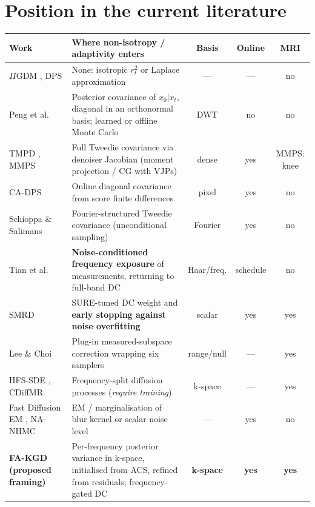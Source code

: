 \documentclass[10pt,a4paper]{article}
\newcommand{\fakgd}{FA-KGD}
\newcommand{\pigdm}{$\Pi$GDM}
\begin{document}
\section{Position in the current literature}
\label{sec:lit}
\begin{center}
\small
\begin{tabularx}{\linewidth}{@{}l L c c c@{}}
\toprule
Work & Where non-isotropy / adaptivity enters & Basis & Online & MRI\\
\midrule
\pigdm{} \cite{song2023pigdm}, DPS \cite{chung2023dps} & None: isotropic $r_t^2$ or Laplace approximation & --- & --- & no\\
Peng et al.\ \cite{peng2024optimal} & Posterior covariance of $x_0|x_t$, diagonal in an orthonormal basis; learned or offline Monte Carlo & DWT & no & no\\
TMPD \cite{boys2024tmpd}, MMPS \cite{rozet2024mmps} & Full Tweedie covariance via denoiser Jacobian (moment projection / CG with VJPs) & dense & yes & MMPS: knee\\
CA-DPS \cite{hamidi2024cadps} & Online diagonal covariance from score finite differences & pixel & yes & no\\
Schioppa \& Salimans \cite{schioppa2026covariance} & Fourier-structured Tweedie covariance (unconditional sampling) & Fourier & yes & no\\
Tian et al.\ \cite{tian2026frequency} & \textbf{Noise-conditioned frequency exposure} of measurements, returning to full-band DC & Haar/freq. & schedule & no\\
SMRD \cite{ozturkler2023smrd} & SURE-tuned DC weight and \textbf{early stopping against noise overfitting} & scalar & yes & yes\\
Lee \& Choi \cite{lee2026msc} & Plug-in measured-subspace correction wrapping six samplers & range/null & --- & yes\\
HFS-SDE \cite{cao2024hfssde}, CDiffMR \cite{huang2023cdiffmr} & Frequency-split diffusion processes (\emph{require training}) & k-space & --- & yes\\
Fast Diffusion EM \cite{laroche2024fastdiffem}, NA-NHMC \cite{xia2026nanhmc} & EM / marginalisation of blur kernel or scalar noise level & --- & yes & no\\
\midrule
\textbf{\fakgd{} (proposed framing)} & Per-frequency posterior variance in k-space, initialised from ACS, refined from residuals; frequency-gated DC & \textbf{k-space} & \textbf{yes} & \textbf{yes}\\
\bottomrule
\end{tabularx}
\end{center}
\end{document}
